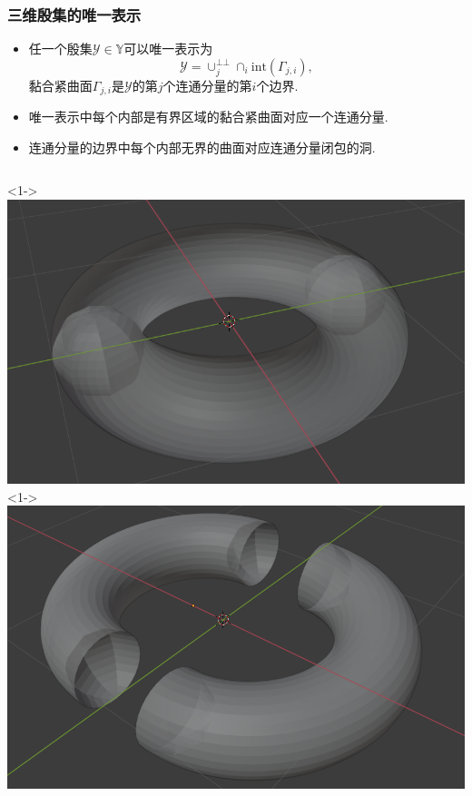 \documentclass[UTF8]{ctexbeamer}	%
\theoremstyle{plain}
\theoremstyle{definition}
\theoremstyle{remark}
\numberwithin{equation}{section}
\begin{document}
\begin{frame}
    \frametitle{三维殷集的唯一表示}
    \begin{itemize}
        \item 任一个殷集$\mathcal{Y} \in \mathbb{Y}$可以唯一表示为
              \[\mathcal{Y} = \cup_j^{\bot \bot} \cap_i \text{int}(\Gamma_{j, i}),\]
              黏合紧曲面$\Gamma_{j, i}$是$\mathcal{Y}$的第$j$个连通分量的第$i$个边界.
        \item 唯一表示中每个内部是有界区域的黏合紧曲面对应一个连通分量.

        \item 连通分量的边界中每个内部无界的曲面对应连通分量闭包的洞.
    \end{itemize}
    \begin{columns}
        <1->
        \includegraphics[width = \textwidth]{fig/s1.png}
        <1->
        \includegraphics[width = \textwidth]{fig/s2.png}
    \end{columns}
\end{frame}
\end{document}
